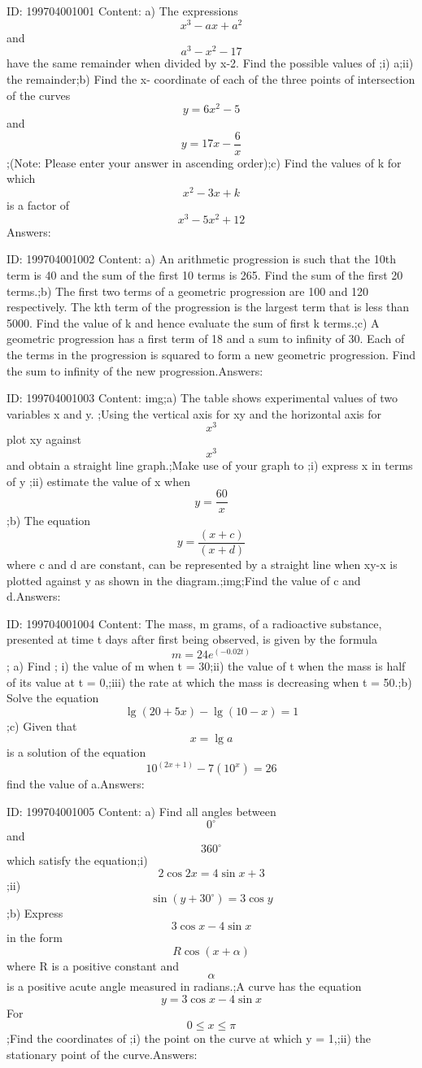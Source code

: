 \documentclass{article}
\begin{document}
ID: 199704001001
Content:
a) The expressions \[x^3-ax+a^2\] and \[a^3-x^2-17\] have the same remainder when divided by x-2. Find the possible values of ;i) a;ii) the remainder;b) Find the x- coordinate of each of the three points of intersection of the curves \[y=6x^2-5\] and \[y=17x-\frac{6}{x}\];(Note: Please enter your answer in ascending order);c) Find the values of k for which \[x^2-3x+k\] is a factor of \[x^3-5x^2+12\]Answers:

ID: 199704001002
Content:
a) An arithmetic progression is such that the 10th term is 40 and the sum of the first 10 terms is 265. Find the sum of the first 20 terms.;b) The first two terms of a geometric progression are 100 and 120 respectively. The kth term of the progression is the largest term that is less than 5000. Find the value of k and hence evaluate the sum of first k terms.;c) A geometric progression has a first term of 18 and a sum to infinity of 30. Each of the terms in the progression is squared to form a new geometric progression. Find the sum to infinity of the new progression.Answers:

ID: 199704001003
Content:
img;a) The table shows experimental values of two variables x and y. ;Using the vertical axis for xy and the horizontal axis for \[x^3\] plot xy against \[x^3\]and obtain a straight line graph.;Make use of your graph to ;i) express x in terms of y ;ii) estimate the value of x when \[y=\frac{60}{x}\] ;b) The equation \[y=\frac{(x+c)}{(x+d)}\] where c and d are constant, can be represented by a straight line when xy-x is plotted against y as shown in the diagram.;img;Find the value of c and d.Answers:

ID: 199704001004
Content:
The mass, m grams, of a radioactive substance, presented at time t days after first being observed, is given by the formula \[m=24e^{(-0.02t)}\]; a) Find ; i) the value of m when t = 30;ii) the value of t when the mass is half of its value at t = 0,;iii) the rate at which the mass is decreasing when t = 50.;b) Solve the equation \[\lg(20+5x)-\lg(10-x)=1\];c) Given that \[x=\lg a\] is a solution of the equation \[10^{(2x+1)}-7(10^x)=26\] find the value of a.Answers:

ID: 199704001005
Content:
a) Find all angles between \[0^{\circ}\]  and \[360^{\circ}\]   which satisfy the equation;i) \[2\cos2x=4\sin x+3\];ii) \[\sin(y+30^{\circ})=3\cos y\];b) Express \[3\cos x-4\sin x\] in the form \[R\cos(x+\alpha)\] where R is a positive constant and \[\alpha\] is a positive acute angle measured in radians.;A curve has the equation \[y=3\cos x-4\sin x\] For \[0\leq x\leq \pi \];Find the coordinates of ;i) the point on the curve at which y = 1,;ii) the stationary point of the curve.Answers:
\end{document}
